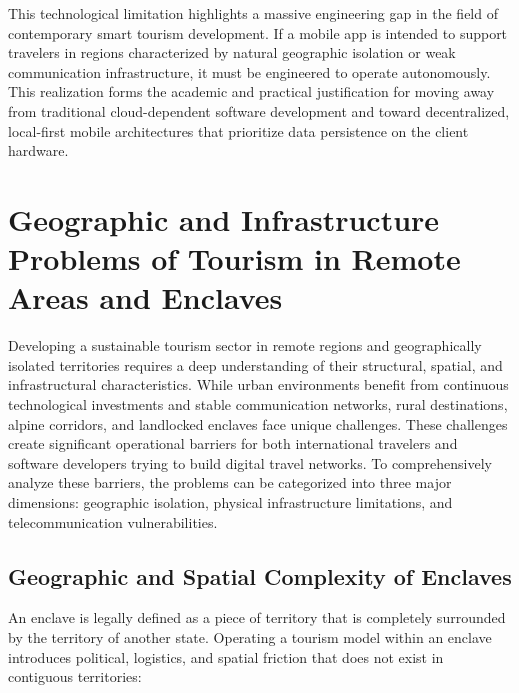\documentclass[12pt,a4paper,oneside]{report}
\begin{document}
This technological limitation highlights a massive engineering gap in the field of
contemporary smart tourism development. If a mobile app is intended to support travelers
in regions characterized by natural geographic isolation or weak communication
infrastructure, it must be engineered to operate autonomously. This realization forms the
academic and practical justification for moving away from traditional cloud-dependent
software development and toward decentralized, local-first mobile architectures that
prioritize data persistence on the client hardware.

\section{Geographic and Infrastructure Problems of Tourism in Remote Areas and Enclaves}

Developing a sustainable tourism sector in remote regions and geographically isolated
territories requires a deep understanding of their structural, spatial, and
infrastructural characteristics. While urban environments benefit from continuous
technological investments and stable communication networks, rural destinations, alpine
corridors, and landlocked enclaves face unique challenges. These challenges create
significant operational barriers for both international travelers and software developers
trying to build digital travel networks. To comprehensively analyze these barriers, the
problems can be categorized into three major dimensions: geographic isolation, physical
infrastructure limitations, and telecommunication vulnerabilities.

\subsection{Geographic and Spatial Complexity of Enclaves}

An enclave is legally defined as a piece of territory that is completely surrounded by
the territory of another state. Operating a tourism model within an enclave introduces
political, logistics, and spatial friction that does not exist in contiguous territories:
\end{document}
